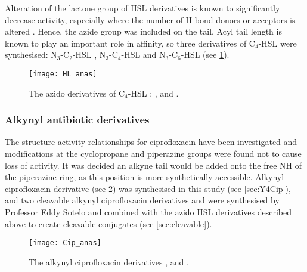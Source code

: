Alteration of the lactone group of HSL derivatives is known to significantly decrease activity, especially where the number of H-bond donors or acceptors is altered \cite{Galloway2011}. Hence, the azide group was included on the tail\cite{Stacy2013}. Acyl tail length is known to play an important role in affinity\cite{Galloway2011}, so three derivatives of C$_4$-HSL  were synthesised: N$_3$-C$_2$-HSL , N$_3$-C$_4$-HSL  and N$_3$-C$_6$-HSL  (see \ref{fig:HL_anas}).

\begin{figure}[H]
	\begin{center}
		\texttt{[image: HL\_anas]}
		\caption{The azido derivatives of C$_4$-HSL :  ,  and . \label{fig:HL_anas}}
	\end{center}
\end{figure}


\subsubsection{Alkynyl antibiotic derivatives}


The structure-activity relationships for ciprofloxacin  have been investigated \cite{Renau1996} and modifications at the cyclopropane and piperazine groups were found not to cause loss of activity. It was decided an alkyne tail would be added onto the free NH of the piperazine ring, as this position is more synthetically accessible. 
Alkynyl ciprofloxacin derivative  (see \ref{fgr:Cip_anas}) was synthesised in this study (see \ref{sec:Y4Cip}), and two cleavable alkynyl ciprofloxacin derivatives  and  were synthesised by Professor Eddy Sotelo and combined with the azido HSL derivatives described above to create cleavable conjugates (see \ref{sec:cleavable}).


\begin{figure}[H]
	\begin{center}
		\texttt{[image: Cip\_anas]}
		\caption{The alkynyl ciprofloxacin derivatives ,  and . \label{fgr:Cip_anas}}
	\end{center}
\end{figure}

